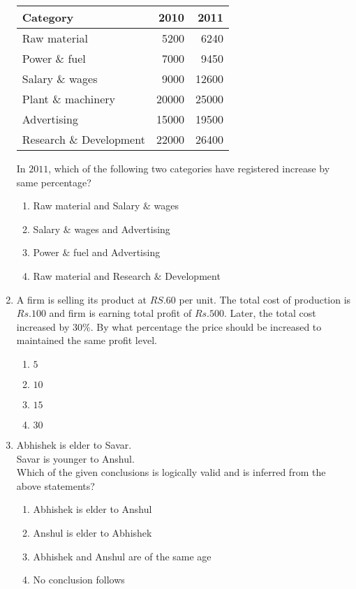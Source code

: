 \documentclass[journal]{IEEEtran}
\begin{document}
\begin{enumerate}
    \begin{center}
    \begin{tabular}{|l|r|r|}
        \hline
        \textbf{Category} & \textbf{2010 } & \textbf{2011 } \\
        \hline
        Raw material & 5200 & 6240 \\
        Power \& fuel & 7000 & 9450 \\
        Salary \& wages & 9000 & 12600 \\
        Plant \& machinery & 20000 & 25000 \\
        Advertising & 15000 & 19500 \\
        Research \& Development & 22000 & 26400 \\
        \hline
    \end{tabular}
\end{center}
In $2011$, which of the following two categories have registered increase by same percentage?
\begin{enumerate}
    \item Raw material and Salary $\&$ wages
    \item Salary $\&$ wages and Advertising
    \item Power $\&$ fuel and Advertising
    \item Raw material and Research $\&$ Development
\end{enumerate}
\item A firm is selling its product at $RS. 60$ per unit. The total cost of production is $Rs. 100$ and firm is earning total profit of $Rs. 500.$ Later, the total cost increased by $30\%$. By what percentage the price should be increased to maintained the same profit level.
\begin{multicols}{4}
    \begin{enumerate}
        \item $5$
        \item $10$
        \item $15$
        \item $30$
    \end{enumerate}
\end{multicols}
\item Abhishek is elder to Savar.\\
Savar is younger to Anshul.\\
Which of the given conclusions is logically valid and is inferred from the above statements?
\begin{enumerate}
    \item Abhishek is elder to Anshul
    \item  Anshul is elder to Abhishek
    \item Abhishek and Anshul are of the same age
    \item No conclusion follows
\end{enumerate}
\end{enumerate}
\end{document}
